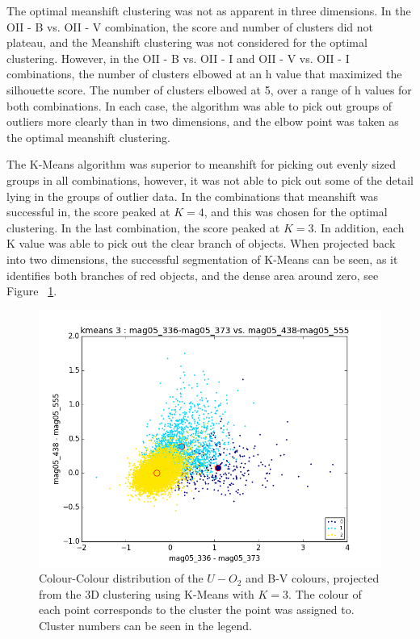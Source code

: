 The optimal meanshift clustering was not as apparent in three dimensions.
In the OII - B vs. OII - V combination, the score and number of clusters did not plateau, and the Meanshift clustering was not considered for the optimal clustering.
However, in the OII - B vs. OII - I and OII - V vs. OII - I combinations, the number of clusters elbowed at an h value that maximized the silhouette score.
The number of clusters elbowed at 5, over a range of h values for both combinations.
In each case, the algorithm was able to pick out groups of outliers more clearly than in two dimensions, and the elbow point was taken as the optimal meanshift clustering.

The K-Means algorithm was superior to meanshift for picking out evenly sized groups in all combinations, however, it was not able to pick out some of the detail lying in the groups of outlier data. 
In the combinations that meanshift was successful in, the score peaked at $K=4$, and this was chosen for the optimal clustering. In the last combination, the score peaked at $K=3$.
In addition, each K value was able to pick out the clear branch of objects.
When projected back into two dimensions, the successful segmentation of K-Means can be seen, as it identifies both branches of red objects, and the dense area around zero, see Figure ~\ref{fig:UOIIKM2d}.

\begin{figure}
\centering
\includegraphics[width=\linewidth]{figs/kmeans_base_color_3cl_mag05_336-mag05_373vsmag05_438-mag05_555}
\caption{Colour-Colour distribution of the $U-O_{2}$ and B-V colours, projected from the 3D clustering using K-Means with $K=3$. The colour of each point corresponds to the cluster the point was assigned to. Cluster numbers can be seen in the legend.}
\label{fig:UOIIKM2d}
\end{figure}

